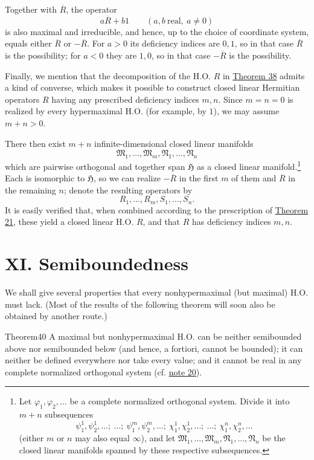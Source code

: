 ﻿\documentclass[paper=b5,fontsize=13pt,bookmarkpackage=false,twoside]{scrartcl}
\begin{document}
Together with $\overline R$, the operator
\[
a\overline R+b1
\qquad(a,b\ \text{real},\ a\ne0)
\]
is also maximal and irreducible, and hence, up to the choice of coordinate system, equals either $\overline R$ or $-\overline R$. For $a>0$ its deficiency indices are $0,1$, so in that case $\overline R$ is the possibility; for $a<0$ they are $1,0$, so in that case $-\overline R$ is the possibility.

Finally, we mention that the decomposition of the H.O. $R$ in \hyperref[thm:38]{Theorem 38} admits a kind of converse, which makes it possible to construct closed linear Hermitian operators $R$ having any prescribed deficiency indices $m,n$. Since $m=n=0$ is realized by every hypermaximal H.O. (for example, by $1$), we may assume $m+n>0$.

There then exist $m+n$ infinite-dimensional closed linear manifolds
\[
\mathfrak M_1,\ldots,\mathfrak M_m,
\mathfrak N_1,\ldots,\mathfrak N_n
\]
which are pairwise orthogonal and together span $\mathfrak H$ as a closed linear manifold.\footnote{\label{fn:57}Let $\varphi_1,\varphi_2,\ldots$ be a complete normalized orthogonal system. Divide it into $m+n$ subsequences
\[
\psi_1^1,\psi_2^1,\ldots;\ \ldots;\
\psi_1^m,\psi_2^m,\ldots;\
\chi_1^1,\chi_2^1,\ldots;\ \ldots;\
\chi_1^n,\chi_2^n,\ldots
\]
(either $m$ or $n$ may also equal $\infty$), and let
$\mathfrak M_1,\ldots,\mathfrak M_m,\mathfrak N_1,\ldots,\mathfrak N_n$
be the closed linear manifolds spanned by these respective subsequences.}
Each is isomorphic to $\mathfrak H$, so we can realize $-\overline R$ in the first $m$ of them and $\overline R$ in the remaining $n$; denote the resulting operators by
\[
R_1,\ldots,R_m,S_1,\ldots,S_n.
\]
It is easily verified that, when combined according to the prescription of \hyperref[thm:21]{Theorem 21}, these yield a closed linear H.O. $R$, and that $R$ has deficiency indices $m,n$.

\section*{XI. Semiboundedness}\label{chap:XI}
\addcontentsline{toc}{section}{XI. Semiboundedness}

We shall give several properties that every nonhypermaximal (but maximal) H.O. must lack. (Most of the results of the following theorem will soon also be obtained by another route.)

\begin{namedstatement}{Theorem}{40}\label{thm:40}
A maximal but nonhypermaximal H.O. can be neither semibounded above nor semibounded below (and hence, a fortiori, cannot be bounded); it can neither be defined everywhere nor take every value; and it cannot be real in any complete normalized orthogonal system (cf. \hyperref[fn:source-20]{note 20}).
\end{namedstatement}
\end{document}
